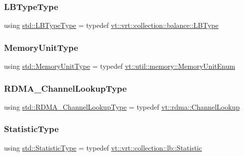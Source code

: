 \subsubsection{\texorpdfstring{L\+B\+Type\+Type}{LBTypeType}}
{\footnotesize\ttfamily using \hyperlink{namespacevt_1_1vrt_1_1collection_1_1balance_ac4f99693509affcc67db182d4aad9b5c}{std\+::\+L\+B\+Type\+Type} = typedef \hyperlink{namespacevt_1_1vrt_1_1collection_1_1balance_ac4f99693509affcc67db182d4aad9b5c}{vt\+::vrt\+::collection\+::balance\+::\+L\+B\+Type}}

\mbox{\label{namespacestd_ad7105ed4fa94bea7fce7b09cea2c7165}} 
\subsubsection{\texorpdfstring{Memory\+Unit\+Type}{MemoryUnitType}}
{\footnotesize\ttfamily using \hyperlink{namespacevt_1_1util_1_1memory_a64df3d84293b34009f78e2a1db2f9bb6}{std\+::\+Memory\+Unit\+Type} = typedef \hyperlink{namespacevt_1_1util_1_1memory_a64df3d84293b34009f78e2a1db2f9bb6}{vt\+::util\+::memory\+::\+Memory\+Unit\+Enum}}

\mbox{\label{namespacestd_a30c426bd959ae4c3814e36d01efe9df7}} 
\subsubsection{\texorpdfstring{R\+D\+M\+A\+\_\+\+Channel\+Lookup\+Type}{RDMA\_ChannelLookupType}}
{\footnotesize\ttfamily using \hyperlink{namespacestd_a30c426bd959ae4c3814e36d01efe9df7}{std\+::\+R\+D\+M\+A\+\_\+\+Channel\+Lookup\+Type} = typedef \hyperlink{structvt_1_1rdma_1_1_channel_lookup}{vt\+::rdma\+::\+Channel\+Lookup}}

\mbox{\label{namespacestd_a77b0310083adc8639f9659f5c8b3cf0d}} 
\subsubsection{\texorpdfstring{Statistic\+Type}{StatisticType}}
{\footnotesize\ttfamily using \hyperlink{namespacevt_1_1vrt_1_1collection_1_1lb_af0e20ef9afee77295053aa83bf1348b1}{std\+::\+Statistic\+Type} = typedef \hyperlink{namespacevt_1_1vrt_1_1collection_1_1lb_af0e20ef9afee77295053aa83bf1348b1}{vt\+::vrt\+::collection\+::lb\+::\+Statistic}}

